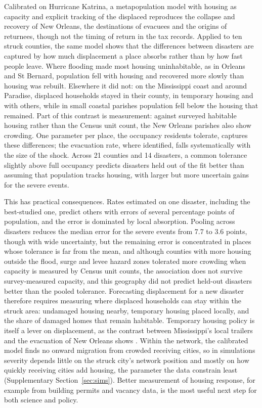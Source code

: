 \documentclass[11pt]{article}
\begin{document}
Calibrated on Hurricane Katrina, a metapopulation model with housing as capacity and explicit tracking of the displaced reproduces the collapse and recovery of New Orleans, the destinations of evacuees and the origins of returnees, though not the timing of return in the tax records. Applied to ten struck counties, the same model shows that the differences between disasters are captured by how much displacement a place absorbs rather than by how fast people leave. Where flooding made most housing uninhabitable, as in Orleans and St Bernard, population fell with housing and recovered more slowly than housing was rebuilt. Elsewhere it did not: on the Mississippi coast and around Paradise, displaced households stayed in their county, in temporary housing and with others, while in small coastal parishes population fell below the housing that remained. Part of this contrast is measurement: against surveyed habitable housing rather than the Census unit count, the New Orleans parishes also show crowding. One parameter per place, the occupancy residents tolerate, captures these differences; the evacuation rate, where identified, falls systematically with the size of the shock. Across 21 counties and 14 disasters, a common tolerance slightly above full occupancy predicts disasters held out of the fit better than assuming that population tracks housing, with larger but more uncertain gains for the severe events.

This has practical consequences. Rates estimated on one disaster, including the best-studied one, predict others with errors of several percentage points of population, and the error is dominated by local absorption. Pooling across disasters reduces the median error for the severe events from 7.7 to 3.6 points, though with wide uncertainty, but the remaining error is concentrated in places whose tolerance is far from the mean, and although counties with more housing outside the flood, surge and levee hazard zones tolerated more crowding when capacity is measured by Census unit counts, the association does not survive survey-measured capacity, and this geography did not predict held-out disasters better than the pooled tolerance. Forecasting displacement for a new disaster therefore requires measuring where displaced households can stay within the struck area: undamaged housing nearby, temporary housing placed locally, and the share of damaged homes that remain habitable. Temporary housing policy is itself a lever on displacement, as the contrast between Mississippi's local trailers and the evacuation of New Orleans shows \citep{EvansCowley2011,GAO2007}. Within the network, the calibrated model finds no onward migration from crowded receiving cities, so in simulations severity depends little on the struck city's network position and mostly on how quickly receiving cities add housing, the parameter the data constrain least (Supplementary Section~\ref{sec:sims}). Better measurement of housing response, for example from building permits and vacancy data, is the most useful next step for both science and policy.
\end{document}

